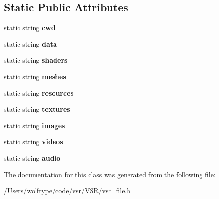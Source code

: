 \subsection*{Static Public Attributes}
\begin{DoxyCompactItemize}
\item 
\hypertarget{classvsr_1_1_file_abe309c8ec49d011e33c4b875b9566dbd}{static string {\bfseries cwd}}\label{classvsr_1_1_file_abe309c8ec49d011e33c4b875b9566dbd}

\item 
\hypertarget{classvsr_1_1_file_a24c097946ef7da4b966b1b5e19123ba7}{static string {\bfseries data}}\label{classvsr_1_1_file_a24c097946ef7da4b966b1b5e19123ba7}

\item 
\hypertarget{classvsr_1_1_file_a4338088885365771ca47c0664f526702}{static string {\bfseries shaders}}\label{classvsr_1_1_file_a4338088885365771ca47c0664f526702}

\item 
\hypertarget{classvsr_1_1_file_afa7be9925ae6ac0e5929f0a103f8ec8c}{static string {\bfseries meshes}}\label{classvsr_1_1_file_afa7be9925ae6ac0e5929f0a103f8ec8c}

\item 
\hypertarget{classvsr_1_1_file_af52b76fff02c98eaff2491687c32d45a}{static string {\bfseries resources}}\label{classvsr_1_1_file_af52b76fff02c98eaff2491687c32d45a}

\item 
\hypertarget{classvsr_1_1_file_ac90f50511fbd088ed4b655417e330a97}{static string {\bfseries textures}}\label{classvsr_1_1_file_ac90f50511fbd088ed4b655417e330a97}

\item 
\hypertarget{classvsr_1_1_file_aa5e4ff9276cc765811e966fb942d51bd}{static string {\bfseries images}}\label{classvsr_1_1_file_aa5e4ff9276cc765811e966fb942d51bd}

\item 
\hypertarget{classvsr_1_1_file_ac392575bce3af6bb2c10f4f25526556f}{static string {\bfseries videos}}\label{classvsr_1_1_file_ac392575bce3af6bb2c10f4f25526556f}

\item 
\hypertarget{classvsr_1_1_file_a4e2147bbfce3bc8c08386394fccb9a7a}{static string {\bfseries audio}}\label{classvsr_1_1_file_a4e2147bbfce3bc8c08386394fccb9a7a}

\end{DoxyCompactItemize}


The documentation for this class was generated from the following file\-:\begin{DoxyCompactItemize}
\item 
/\-Users/wolftype/code/vsr/\-V\-S\-R/vsr\-\_\-file.\-h\end{DoxyCompactItemize}
